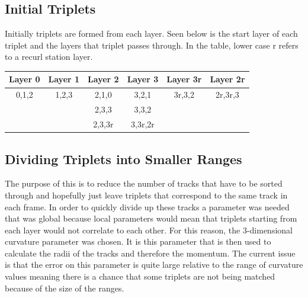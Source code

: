 \subsection{Initial Triplets}
Initially triplets are formed from each layer. Seen below is the start layer of each triplet and the layers that triplet passes through. In the table, lower case r refers to a recurl station layer.
\vspace{0.3cm}
\begin{center}
\begin{tabular}{||c c c c c c||} 
 \hline
 Layer 0 & Layer 1 & Layer 2 & Layer 3 & Layer 3r & Layer 2r \\ [0.5ex] 
 \hline\hline
 0,1,2 & 1,2,3 & 2,1,0 & 3,2,1 & 3r,3,2 & 2r,3r,3 \\ 
 \hline
  &  & 2,3,3 & 3,3,2 &  &  \\
 \hline
  &  & 2,3,3r & 3,3r,2r &  &   \\
 \hline
\end{tabular}
\label{tab:1}
\end{center}
\subsection{Dividing Triplets into Smaller Ranges}
\label{2}
The purpose of this is to reduce the number of tracks that have to be sorted through and hopefully just leave triplets that correspond to the same track in each frame. In order to quickly divide up these tracks a parameter was needed that was global because local parameters would mean that triplets starting from each layer would not correlate to each other. For this reason, the 3-dimensional curvature parameter was chosen. It is this parameter that is then used to calculate the radii of the tracks and therefore the momentum. The current issue is that the error on this parameter is quite large relative to the range of curvature values meaning there is a chance that some triplets are not being matched because of the size of the ranges.
